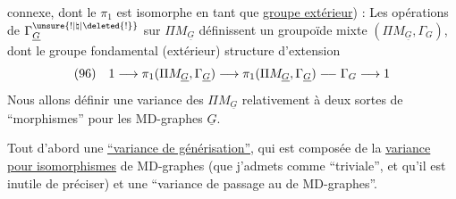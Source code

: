 connexe, dont le $\pi_1$ est isomorphe en tant que \uline{groupe extérieur}) :
Les opérations de $\Gamma^{\unsure{!|\natural|\deleted{!}}}_{\underline G}$ sur $\Pi M_{\underline G}$ définissent un groupoïde mixte $(\Pi M_{\underline G},\Gamma_G)$, dont le groupe fondamental (extérieur)    structure d'extension
\[
(96)\quad1\longrightarrow\pi_1(\Pi M_{\underline G},\Gamma_{\underline G})\longrightarrow\pi_1(\Pi M_{\underline G},\Gamma_{\underline G})\relbar\joinrel\relbar\Gamma_G\longrightarrow1
\]
Nous allons définir une  variance des $\Pi M_{\underline G}$ relativement à deux sortes de ``morphismes'' pour les MD-graphes $\underline G$. 

Tout d'abord une \uline{``variance de générisation''}, qui est composée de la \uline{variance pour isomorphismes} de MD-graphes (que j'admets comme ``triviale'', et qu'il est inutile de préciser) et une ``variance de passage au  de MD-graphes''.
